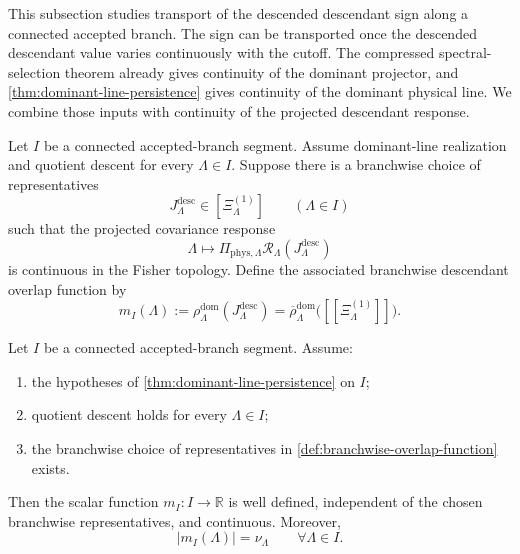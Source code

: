 \documentclass[11pt]{article}
\begin{document}
This subsection studies transport of the descended descendant sign along a connected accepted
branch. The sign can be transported once the descended descendant value varies continuously with the
cutoff. The compressed spectral-selection theorem already gives continuity of the dominant
projector, and \cref{thm:dominant-line-persistence} gives continuity of the dominant physical line.
We combine those inputs with continuity of the projected descendant response.

\begin{definition}
\label{def:branchwise-overlap-function}
Let \(I\) be a connected accepted-branch segment.
Assume dominant-line realization and quotient descent for every \(\Lambda\in I\).
Suppose there is a branchwise choice of representatives
\[
J^{\mathrm{desc}}_{\Lambda}\in[\Xi^{(1)}_{\Lambda}]
\qquad
(\Lambda\in I)
\]
such that the projected covariance response
\[
\Lambda\longmapsto
\Pi_{\mathrm{phys},\Lambda}\mathcal R_{\Lambda}(J^{\mathrm{desc}}_{\Lambda})
\]
is continuous in the Fisher topology.
Define the associated branchwise descendant overlap function by
\begin{equation}
m_I(\Lambda)
:=
\rho^{\mathrm{dom}}_{\Lambda}(J^{\mathrm{desc}}_{\Lambda})
=
\overline{\rho}^{\mathrm{dom}}_{\Lambda}\big([\![\Xi^{(1)}_{\Lambda}]\!]\big).
\label{eq:branchwise-overlap-function}
\end{equation}
\end{definition}

\begin{proposition}
\label{prop:branchwise-overlap-continuity}
Let \(I\) be a connected accepted-branch segment.
Assume:
\begin{enumerate}[leftmargin=2em]
\item the hypotheses of \cref{thm:dominant-line-persistence} on \(I\);
\item quotient descent holds for every \(\Lambda\in I\);
\item the branchwise choice of representatives in
  \cref{def:branchwise-overlap-function} exists.
\end{enumerate}
Then the scalar function \(m_I:I\to\mathbb R\) is well defined, independent of the chosen
branchwise representatives, and continuous.
Moreover,
\begin{equation}
|m_I(\Lambda)|
=
\nu_{\Lambda}
\qquad
\forall \Lambda\in I.
\label{eq:branchwise-overlap-margin}
\end{equation}
\end{proposition}
\end{document}
